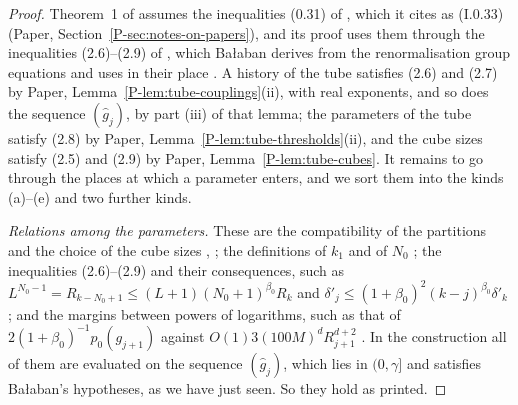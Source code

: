 \documentclass[11pt]{preprint}
\numberwithin{equation}{section}
\theoremstyle{definition}
\theoremstyle{remark}
\theoremstyle{plain}
\begin{document}
\begin{proof}
Theorem~1 of \cite[p.~262]{BalabanCRE} assumes the inequalities (0.31) of \cite[p.~259]{BalabanRG1}, which it cites as (I.0.33) (Paper, Section~\ref{P-sec:notes-on-papers}), and its proof uses them through the inequalities (2.6)--(2.9) of \cite[pp.~255--256]{BalabanCRE}, which Ba{\l}aban derives from the renormalisation group equations and uses in their place \cite[p.~255]{BalabanCRE}. A history of the tube satisfies (2.6) and (2.7) by Paper, Lemma~\ref{P-lem:tube-couplings}(ii), with real exponents, and so does the sequence $(\hat g_j)$, by part (iii) of that lemma; the parameters of the tube satisfy (2.8) by Paper, Lemma~\ref{P-lem:tube-thresholds}(ii), and the cube sizes satisfy (2.5) and (2.9) by Paper, Lemma~\ref{P-lem:tube-cubes}. It remains to go through the places at which a parameter enters, and we sort them into the kinds (a)--(e) and two further kinds.

\emph{Relations among the parameters.} These are the compatibility of the partitions and the choice of the cube sizes \cite[pp.~245, 264]{BalabanCRE}, \cite[p.~177]{BalabanLFR1}; the definitions of $k_1$ \cite[p.~270]{BalabanCRE} and of $N_0$ \cite[p.~179]{BalabanLFR1}; the inequalities (2.6)--(2.9) and their consequences, such as $L^{N_0-1} = R_{k-N_0+1} \leq (L + 1)(N_0 + 1)^{\beta_0}R_k$ and $\delta'_j \leq (1 + \beta_0)^2(k - j)^{\beta_0}\delta'_k$ \cite[p.~192]{BalabanLFR1}; and the margins between powers of logarithms, such as that of $2(1 + \beta_0)^{-1}p_0(g_{j+1})$ against $O(1)3(100M)^dR_{j+1}^{d+2}$ \cite[(1.88), p.~387]{BalabanLFR2}. In the construction all of them are evaluated on the sequence $(\hat g_j)$, which lies in $(0, \gamma]$ and satisfies Ba{\l}aban's hypotheses, as we have just seen. So they hold as printed.


\end{proof}
\end{document}
